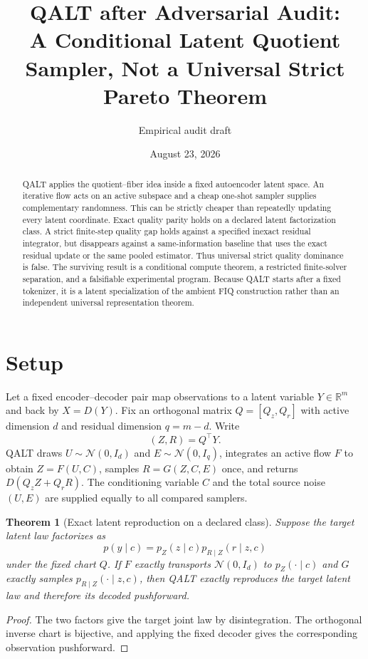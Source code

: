 \documentclass[11pt]{article}
\title{QALT after Adversarial Audit:\\A Conditional Latent Quotient Sampler, Not a Universal Strict Pareto Theorem}
\author{Empirical audit draft}
\date{August 23, 2026}
\newtheorem{theorem}{Theorem}
\newcommand{\R}{\mathbb R}
\begin{document}
\maketitle

\begin{abstract}
QALT applies the quotient--fiber idea inside a fixed autoencoder latent space.  An iterative flow acts on an active subspace and a cheap one-shot sampler supplies complementary randomness.  This can be strictly cheaper than repeatedly updating every latent coordinate.  Exact quality parity holds on a declared latent factorization class.  A strict finite-step quality gap holds against a specified inexact residual integrator, but disappears against a same-information baseline that uses the exact residual update or the same pooled estimator.  Thus universal strict quality dominance is false.  The surviving result is a conditional compute theorem, a restricted finite-solver separation, and a falsifiable experimental program.  Because QALT starts after a fixed tokenizer, it is a latent specialization of the ambient FIQ construction rather than an independent universal representation theorem.
\end{abstract}

\section{Setup}

Let a fixed encoder--decoder pair map observations to a latent variable $Y\in\R^m$ and back by $X=D(Y)$.  Fix an orthogonal matrix $Q=[Q_z,Q_r]$ with active dimension $d$ and residual dimension $q=m-d$.  Write
\[
  (Z,R)=Q^\top Y.
\]
QALT draws $U\sim\mathcal N(0,I_d)$ and $E\sim\mathcal N(0,I_q)$, integrates an active flow $F$ to obtain $Z=F(U,C)$, samples $R=G(Z,C,E)$ once, and returns $D(Q_zZ+Q_rR)$.  The conditioning variable $C$ and the total source noise $(U,E)$ are supplied equally to all compared samplers.

\begin{theorem}[Exact latent reproduction on a declared class]
Suppose the target latent law factorizes as
\[
 p(y\mid c)=p_Z(z\mid c)p_{R\mid Z}(r\mid z,c)
\]
under the fixed chart $Q$.  If $F$ exactly transports $\mathcal N(0,I_d)$ to $p_Z(\cdot\mid c)$ and $G$ exactly samples $p_{R\mid Z}(\cdot\mid z,c)$, then QALT exactly reproduces the target latent law and therefore its decoded pushforward.
\end{theorem}
\begin{proof}
The two factors give the target joint law by disintegration.  The orthogonal inverse chart is bijective, and applying the fixed decoder gives the corresponding observation pushforward.
\end{proof}
\end{document}
